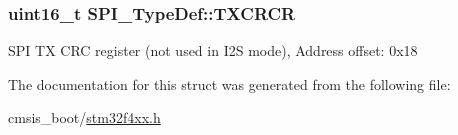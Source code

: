 \subsubsection[{\texorpdfstring{T\+X\+C\+R\+CR}{TXCRCR}}]{ uint16\+\_\+t S\+P\+I\+\_\+\+Type\+Def\+::\+T\+X\+C\+R\+CR}\hypertarget{struct_s_p_i___type_def_a3c0c1be66bc0a1846274a7511f4a36f5}{}\label{struct_s_p_i___type_def_a3c0c1be66bc0a1846274a7511f4a36f5}
S\+PI TX C\+RC register (not used in I2S mode), Address offset\+: 0x18 

The documentation for this struct was generated from the following file\+:\begin{DoxyCompactItemize}
\item 
cmsis\+\_\+boot/\hyperlink{stm32f4xx_8h}{stm32f4xx.\+h}\end{DoxyCompactItemize}
